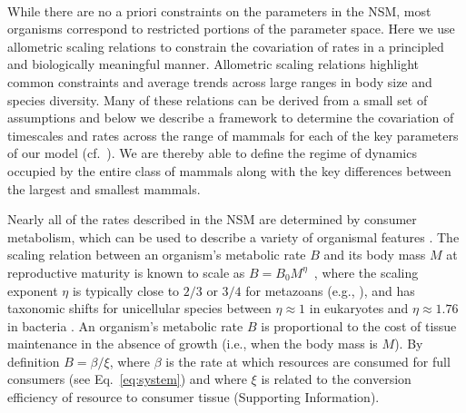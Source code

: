 \documentclass{pnastwo}
\begin{document}
\begin{article}
 \\
While there are no a priori constraints on the parameters in the NSM, most
organisms correspond to restricted portions of the parameter space.  Here we
use allometric scaling relations to constrain the covariation of rates in a
principled and biologically meaningful manner.  Allometric scaling relations
highlight common constraints and average trends across large ranges in body
size and species diversity. Many of these relations can be derived from a
small set of assumptions and below we describe a framework to determine the
covariation of timescales and rates across the range of mammals for each of
the key parameters of our model (cf.~\cite{Yodzis:1992hg}).  We are thereby
able to define the regime of dynamics occupied by the entire class of mammals
along with the key differences between the largest and smallest mammals.


Nearly all of the rates described in the NSM are determined by consumer
metabolism, which can be used to describe a variety of organismal features
\cite{Brown:2004wq}.  The scaling relation between an organism's metabolic
rate $B$ and its body mass $M$ at reproductive maturity is known to scale as
$B = B_0 M^\eta$~\cite{West:2002it}, where the scaling exponent $\eta$ is
typically close to $2/3$ or $3/4$ for metazoans (e.g., \cite{Brown:2004wq}),
and has taxonomic shifts for unicellular species between $\eta\approx 1$ in
eukaryotes and $\eta\approx 1.76$ in bacteria
\cite{DeLong:2010dy,Kempes:2012hy}.
{\color{blue}An organism's metabolic rate $B$ is proportional to the cost of tissue
maintenance in the absence of growth (i.e., when the body mass is $M$).  By
definition $B=\beta/\xi$, where $\beta$ is the rate at which resources are
consumed for full consumers (see Eq.~\eqref{eq:system}) and where $\xi$ is
related to the conversion efficiency of resource to consumer tissue
(Supporting Information).
}


\end{article}
\end{document}
